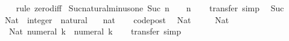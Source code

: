 \begin{isabellebody}
%
\isadelimproof
\ \ %
\endisadelimproof
%
\isatagproof
{}\isamarkupfalse%
\ {\isacharparenleft}{\kern0pt}rule\ zero{\isacharunderscore}{\kern0pt}diff{\isacharparenright}{\kern0pt}%
\endisatagproof
{\isafoldproof}%
%
\isadelimproof
\isanewline
%
\endisadelimproof
\isanewline
{}\isamarkupfalse%
\ Suc{\isacharunderscore}{\kern0pt}natural{\isacharunderscore}{\kern0pt}minus{\isacharunderscore}{\kern0pt}one{\isacharcolon}{\kern0pt}\ {\isachardoublequoteopen}Suc\ n\ {\isacharminus}{\kern0pt}\ {}\ {\isacharequal}{\kern0pt}\ n{\isachardoublequoteclose}\isanewline
%
\isadelimproof
\ \ %
\endisadelimproof
%
\isatagproof
{}\isamarkupfalse%
\ transfer\ simp%
\endisatagproof
{\isafoldproof}%
%
\isadelimproof
\isanewline
%
\endisadelimproof
\isanewline
{}\isamarkupfalse%
\ {\isacharparenleft}{\kern0pt}\ Suc%
\isadelimdocument
%
\endisadelimdocument
%
\isatagdocument
%
\isamarkuptrue%
%
\endisatagdocument
{\isafolddocument}%
%
\isadelimdocument
%
\endisadelimdocument
{}\isamarkupfalse%
\ Nat\ {\isacharcolon}{\kern0pt}{\isacharcolon}{\kern0pt}\ {\isachardoublequoteopen}integer\ {\isasymRightarrow}\ natural{\isachardoublequoteclose}\isanewline
\ \ \ nat\isanewline
%
\isadelimproof
\ \ %
\endisadelimproof
%
\isatagproof
\isacommand{{\isachardot}{\kern0pt}}\isamarkupfalse%
%
\endisatagproof
{\isafoldproof}%
%
\isadelimproof
\isanewline
%
\endisadelimproof
\isanewline
{}\isamarkupfalse%
\ {\isacharbrackleft}{\kern0pt}code{\isacharunderscore}{\kern0pt}post{\isacharbrackright}{\kern0pt}{\isacharcolon}{\kern0pt}\isanewline
\ \ {\isachardoublequoteopen}Nat\ {}\ {\isacharequal}{\kern0pt}\ {}{\isachardoublequoteclose}\isanewline
\ \ {\isachardoublequoteopen}Nat\ {}\ {\isacharequal}{\kern0pt}\ {}{\isachardoublequoteclose}\isanewline
\ \ {\isachardoublequoteopen}Nat\ {\isacharparenleft}{\kern0pt}numeral\ k{\isacharparenright}{\kern0pt}\ {\isacharequal}{\kern0pt}\ numeral\ k{\isachardoublequoteclose}\isanewline
%
\isadelimproof
\ \ %
\endisadelimproof
%
\isatagproof
{}\isamarkupfalse%
\ {\isacharparenleft}{\kern0pt}transfer{\isacharcomma}{\kern0pt}\ simp{\isacharparenright}{\kern0pt}{\isacharplus}{\kern0pt}%
\endisatagproof
{\isafoldproof}%
%
\isadelimproof
\isanewline
%
\endisadelimproof
\isanewline
{}\isamarkupfalse%

\end{isabellebody}
